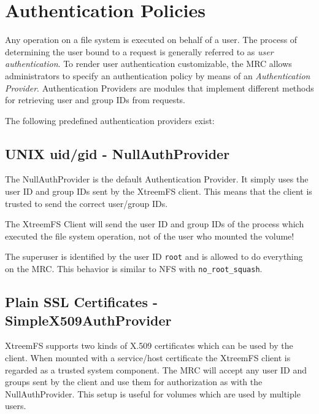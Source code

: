 \documentclass[a4paper,10pt]{book}
\begin{document}
\section{Authentication Policies} \label{sec:authentication_policies}
Any operation on a file system is executed on behalf of a user. The process of determining the user bound to a request is generally referred to as \emph{user authentication}. To render user authentication customizable, the MRC allows administrators to specify an authentication policy by means of an \emph{Authentication Provider}. Authentication Providers are modules that implement different methods for retrieving user and group IDs from requests.

The following predefined authentication providers exist:

\subsection{UNIX uid/gid - NullAuthProvider}

The NullAuthProvider is the default Authentication Provider. It simply uses the user ID and group IDs sent by the XtreemFS client. This means that the client is trusted to send the correct user/group IDs.

The XtreemFS Client will send the user ID and group IDs of the process which executed the file system operation, not of the user who mounted the volume!

The superuser is identified by the user ID \texttt{root} and is allowed to do everything on the MRC. This behavior is similar to NFS with \texttt{no\_root\_squash}.

\subsection{Plain SSL Certificates - SimpleX509AuthProvider}
\label{sec:simple_x509_auth_provider}

XtreemFS supports two kinds of X.509 certificates which can be used by the client. When mounted with a service/host certificate the XtreemFS client is regarded as a trusted system component. The MRC will accept any user ID and groups sent by the client and use them for authorization as with the NullAuthProvider. This setup is useful for volumes which are used by multiple users.
\end{document}
